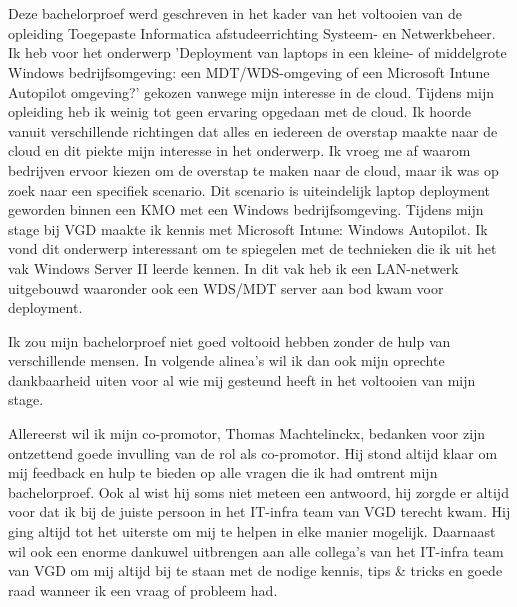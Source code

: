 
\chapter*{}
\label{ch:voorwoord}


Deze bachelorproef werd geschreven in het kader van het voltooien van de opleiding Toegepaste Informatica afstudeerrichting Systeem- en Netwerkbeheer. Ik heb voor het onderwerp 'Deployment van laptops in een kleine- of middelgrote Windows bedrijfsomgeving: een MDT/WDS-omgeving of een Microsoft Intune Autopilot omgeving?' gekozen vanwege mijn interesse in de cloud. Tijdens mijn opleiding heb ik weinig tot geen ervaring opgedaan met de cloud. Ik hoorde vanuit verschillende richtingen dat alles en iedereen de overstap maakte naar de cloud en dit piekte mijn interesse in het onderwerp. Ik vroeg me af waarom bedrijven ervoor kiezen om de overstap te maken naar de cloud, maar ik was op zoek naar een specifiek scenario. Dit scenario is uiteindelijk laptop deployment geworden binnen een KMO met een Windows bedrijfsomgeving. Tijdens mijn stage bij VGD maakte ik kennis met Microsoft Intune: Windows Autopilot. Ik vond dit onderwerp interessant om te spiegelen met de technieken die ik uit het vak Windows Server II leerde kennen. In dit vak heb ik een LAN-netwerk uitgebouwd waaronder ook een WDS/MDT server aan bod kwam voor deployment.

Ik zou mijn bachelorproef niet goed voltooid hebben zonder de hulp van verschillende mensen. In volgende alinea’s wil ik dan ook mijn oprechte dankbaarheid uiten voor al wie mij gesteund heeft in het voltooien van mijn stage.

Allereerst wil ik mijn co-promotor, Thomas Machtelinckx, bedanken voor zijn ontzettend goede invulling van de rol als co-promotor. Hij stond altijd klaar om mij feedback en hulp te bieden op alle vragen die ik had omtrent mijn bachelorproef. Ook al wist hij soms niet meteen een antwoord, hij zorgde er altijd voor dat ik bij de juiste persoon in het IT-infra team van VGD terecht kwam. Hij ging altijd tot het uiterste om mij te helpen in elke manier mogelijk. Daarnaast wil ook een enorme dankuwel uitbrengen aan alle collega’s van het IT-infra team van VGD om mij altijd bij te staan met de nodige kennis, tips & tricks en goede raad wanneer ik een vraag of probleem had.

